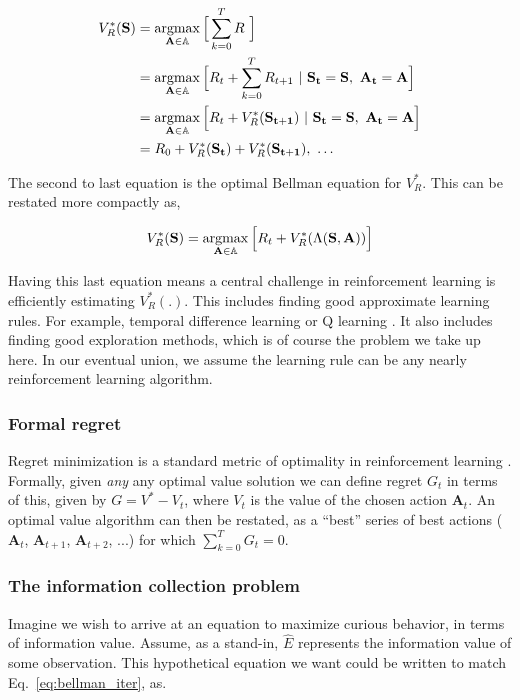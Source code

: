 \begin{equation} 
	\label{eq:bellman_seq}
    \begin{split}
        V^*_{R}(\mathbf{S}) &= \argmax_{\mathbf{A} \in \mathbb{A}} \Big [\sum_{k=0}^{T}  R \ \Big ]\\
                         	&= \argmax_{\mathbf{A} \in \mathbb{A}} \Big [ R_{t} + \sum_{k=0}^{T} R_{t+1} \ | \ \mathbf{S_t} = \mathbf{S},\ \mathbf{A_t} = \mathbf{A} \Big ]\\
							&= \argmax_{\mathbf{A} \in \mathbb{A}} \Big [ R_{t} + V^*_{R}(\mathbf{S_{t+1}}) \ | \ \mathbf{S_t} = \mathbf{S},\ \mathbf{A_t} = \mathbf{A} \Big ]\\
                         	&= R_0 + V^*_{R}(\mathbf{S_{t}}) + V^*_{R}(\mathbf{S_{t+1}}),\ \ldots
    \end{split}
\end{equation}

The second to last equation is the optimal Bellman equation for $V^*_R$. This can be restated more compactly as,

\begin{equation} 
\label{eq:bellman_iter}
V^*_R(\mathbf{S}) = \operatorname*{argmax}_{\mathbf{A} \in \mathbb{A}} \Big [ R_{t}  + V^*_{R}(\Lambda(\mathbf{S},\mathbf{A})) \Big ]
\end{equation}

Having this last equation means a central challenge in reinforcement learning is efficiently estimating $V^*_{R}(.)$. This includes finding good approximate learning rules. For example, temporal difference learning or Q learning \cite{Sutton2018}. It also includes finding good exploration methods, which is of course the problem we take up here. In our eventual union, we assume the learning rule can be any nearly reinforcement learning algorithm. 


\subsubsection*{Formal regret}
Regret minimization is a standard metric of optimality in reinforcement learning \cite{Sutton2018}. Formally, given \emph{any} any optimal value solution we can define regret $G_t$ in terms of this, given by $G = V^* - V_t$, where $V_t$ is the value of the chosen action $\mathbf{A}_t$. An optimal value algorithm can then be restated, as a ``best'' series of best actions ($\mathbf{A}_t$, $\mathbf{A}_{t+1}$, $\mathbf{A}_{t+2}$, ...) for which $\sum_{k=0}^{T} G_t = 0$.

\subsubsection*{The information collection problem}
Imagine we wish to arrive at an equation to maximize curious behavior, in terms of information value. Assume, as a stand-in, $\hat E$ represents the information value of some observation. This hypothetical equation we want could be written to match Eq.~\ref{eq:bellman_iter}, as. 

